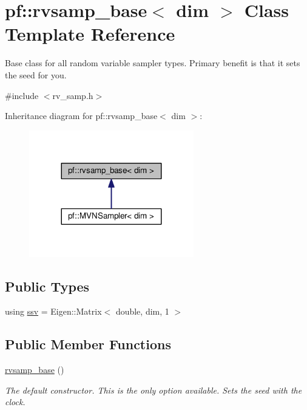 \hypertarget{classpf_1_1rvsamp__base}{}\section{pf\+:\+:rvsamp\+\_\+base$<$ dim $>$ Class Template Reference}
\label{classpf_1_1rvsamp__base}


Base class for all random variable sampler types. Primary benefit is that it sets the seed for you.  




{\ttfamily \#include $<$rv\+\_\+samp.\+h$>$}



Inheritance diagram for pf\+:\+:rvsamp\+\_\+base$<$ dim $>$\+:\nopagebreak
\begin{figure}[H]
\begin{center}
\leavevmode
\includegraphics[width=203pt]{classpf_1_1rvsamp__base__inherit__graph}
\end{center}
\end{figure}
\subsection*{Public Types}
\begin{DoxyCompactItemize}
\item 
using \hyperlink{classpf_1_1rvsamp__base_a5d22b5297cc9ec74dfbc500b76e6747d}{ssv} = Eigen\+::\+Matrix$<$ double, dim, 1 $>$
\end{DoxyCompactItemize}
\subsection*{Public Member Functions}
\begin{DoxyCompactItemize}
\item 
\hyperlink{classpf_1_1rvsamp__base_a72abf1777cf753aa58f2b753232d864f}{rvsamp\+\_\+base} ()\hypertarget{classpf_1_1rvsamp__base_a72abf1777cf753aa58f2b753232d864f}{}\label{classpf_1_1rvsamp__base_a72abf1777cf753aa58f2b753232d864f}

\begin{DoxyCompactList}\small\item\em The default constructor. This is the only option available. Sets the seed with the clock. \end{DoxyCompactList}\end{DoxyCompactItemize}
